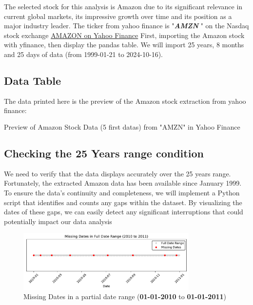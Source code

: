 \documentclass{article}
\begin{document}
The selected stock for this analysis is Amazon due to its significant relevance in current global markets, its impressive growth over time and its position as a major industry leader.
The ticker from yahoo finance is "\textbf{\textit{AMZN}} " on the Nasdaq stock exchange \href{https://finance.yahoo.com/quote/AMZN/.}{AMAZON on Yahoo Finance}
First, importing the Amazon stock with yfinance, then display the pandas table.
We will import 25 years, 8 months and 25 days of data (from 1999-01-21 to 2024-10-16).

\subsection{Data Table}
The data printed here is the preview of the Amazon stock extraction from yahoo finance:
\begin{table}[h!]
    \centering
      
    \caption{Preview of Amazon Stock Data (5 first datas) from "AMZN" in Yahoo Finance}
    \label{tab:amazon_stock_preview}
\end{table}



\subsection{Checking the 25 Years range condition}


We need to verify that the data displays accurately over the 25 years range. 
Fortunately, the extracted  Amazon data has been available since January 1999. 
To ensure the data’s continuity and completeness, we will implement a Python script that identifies and counts any gaps within the dataset. 
By visualizing the dates of these gaps, we can easily detect any significant interruptions that could potentially impact our data analysis

\begin{figure}[H]
    \centering
    \includegraphics[width=0.8\textwidth]{Img/MissingDates(2010_to_2011).pdf}
    \caption{Missing Dates in a partial date range (\textbf{01-01-2010} to \textbf{01-01-2011})}
    \label{fig:missing_dates}
\end{figure}
\end{document}

